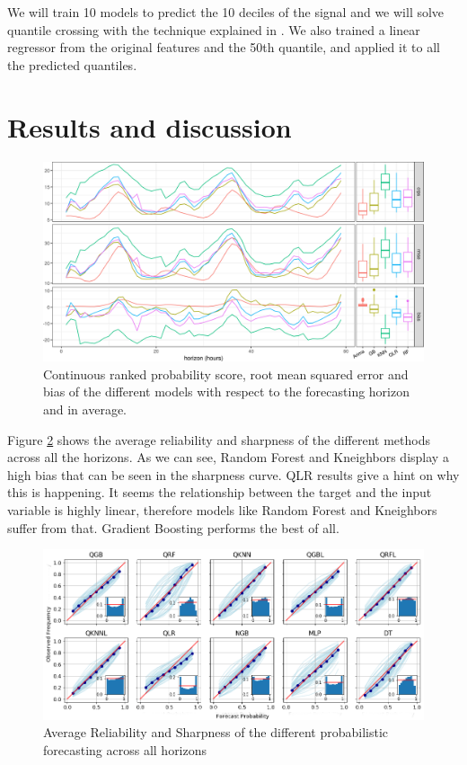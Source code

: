 \documentclass[a4paper,twocolumn,5p]{elsarticle}
\begin{document}
We will train 10 models to predict the 10 deciles of the signal and we will solve 
 quantile crossing with the technique explained in \cite{cross}. We also trained a 
 linear regressor from the original features and the 50th quantile, 
and applied it to all the predicted quantiles. 

\section{Results and discussion}
\label{sec:results}

\begin{figure}
  \centering
  \includegraphics[width=\textwidth]{results/errorGraph}
  \caption{Continuous ranked probability score, root mean squared
    error and bias of the different models with respect to the
    forecasting horizon and in average.}
  \label{figure:errorGraph}
\end{figure}

Figure \ref{figure:rel_sharp} shows the average reliability and sharpness of the 
different methods across all the horizons. 
As we can see, Random Forest and Kneighbors display a high bias that can be seen in the 
sharpness curve. QLR results give a hint on why this is happening. It seems the relationship
between the target and the input variable is highly linear, therefore models like Random 
Forest and Kneighbors suffer from that. Gradient Boosting performs the best of all.

\begin{figure}
  \centering
  \includegraphics[width=1\textwidth]{reliability_sharpness}
  \caption{Average Reliability and Sharpness of the different probabilistic forecasting
  across all horizons}
  \label{figure:rel_sharp}
\end{figure}
\end{document}
